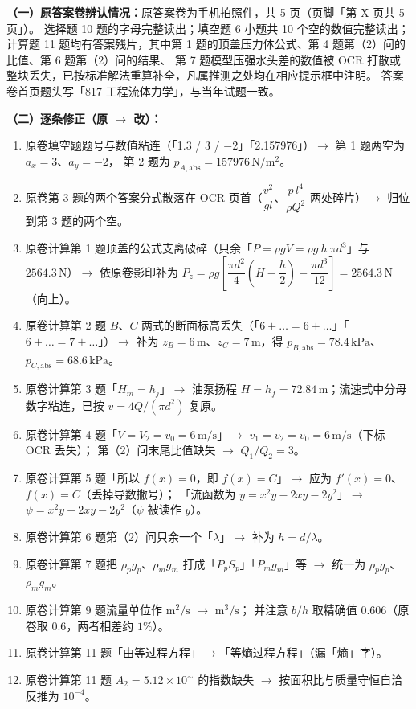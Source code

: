 \begin{tishi}
\textbf{（一）原答案卷辨认情况：}原答案卷为手机拍照件，共 5 页（页脚「第 X 页共 5 页」）。
选择题 10 题的字母完整读出；填空题 6 小题共 10 个空的数值完整读出；
计算题 11 题均有答案残片，其中第 1 题的顶盖压力体公式、第 4 题第（2）问的比值、第 6 题第（2）问的结果、
第 7 题模型压强水头差的数值被 OCR 打散或整块丢失，已按标准解法重算补全，凡属推测之处均在相应提示框中注明。
答案卷首页题头写「817 工程流体力学」，与当年试题一致。

\textbf{（二）逐条修正（原 $\to$ 改）：}
\begin{enumerate}
  \item 原卷填空题题号与数值粘连（「1.3 / 3 / $-2$」「2.157976」）$\to$ 第 1 题两空为 $a_x=3$、$a_y=-2$，
    第 2 题为 $p_{A,\mathrm{abs}}=157976\,\mathrm{N/m^2}$。
  \item 原卷第 3 题的两个答案分式散落在 OCR 页首（$\dfrac{v^{2}}{gl}$、$\dfrac{p\,l^{4}}{\rho Q^{2}}$ 两处碎片）$\to$ 归位到第 3 题的两个空。
  \item 原卷计算第 1 题顶盖的公式支离破碎（只余「$P=\rho gV=\rho g\ h\ \pi d^{3}$」与 $2564.3\,\mathrm{N}$）$\to$
    依原卷影印补为 $P_z=\rho g\left[\dfrac{\pi d^{2}}{4}\left(H-\dfrac h2\right)-\dfrac{\pi d^{3}}{12}\right]=2564.3\,\mathrm{N}$（向上）。
  \item 原卷计算第 2 题 $B$、$C$ 两式的断面标高丢失（「$6+\dots=6+\dots$」「$6+\dots=7+\dots$」）$\to$
    补为 $z_B=6\,\mathrm{m}$、$z_C=7\,\mathrm{m}$，得 $p_{B,\mathrm{abs}}=78.4\,\mathrm{kPa}$、$p_{C,\mathrm{abs}}=68.6\,\mathrm{kPa}$。
  \item 原卷计算第 3 题「$H_m=h_j$」$\to$ 油泵扬程 $H=h_f=72.84\,\mathrm{m}$；流速式中分母数字粘连，已按 $v=4Q/(\pi d^{2})$ 复原。
  \item 原卷计算第 4 题「$V=V_2=v_0=6\,\mathrm{m/s}$」$\to$ $v_1=v_2=v_0=6\,\mathrm{m/s}$（下标 OCR 丢失）；
    第（2）问末尾比值缺失 $\to$ $Q_1/Q_2=3$。
  \item 原卷计算第 5 题「所以 $f(x)=0$，即 $f(x)=C$」$\to$ 应为 $f'(x)=0$、$f(x)=C$（丢掉导数撇号）；
    「流函数为 $y=x^{2}y-2xy-2y^{2}$」$\to$ $\psi=x^{2}y-2xy-2y^{2}$（$\psi$ 被读作 $y$）。
  \item 原卷计算第 6 题第（2）问只余一个「$\lambda$」$\to$ 补为 $h=d/\lambda$。
  \item 原卷计算第 7 题把 $\rho_pg_p$、$\rho_mg_m$ 打成「$P_pS_p$」「$P_mg_m$」等 $\to$ 统一为 $\rho_pg_p$、$\rho_mg_m$。
  \item 原卷计算第 9 题流量单位作 $\mathrm{m^2/s}$ $\to$ $\mathrm{m^3/s}$；
    并注意 $b/h$ 取精确值 $0.606$（原卷取 $0.6$，两者相差约 $1\%$）。
  \item 原卷计算第 11 题「由等过程方程」$\to$「等熵过程方程」（漏「熵」字）。
  \item 原卷计算第 11 题 $A_2=5.12\times10^{\sim}$ 的指数缺失 $\to$ 按面积比与质量守恒自洽反推为 $10^{-4}$。
\end{enumerate}


\end{tishi}
